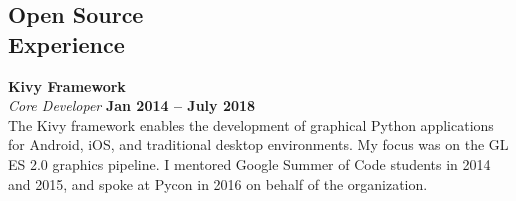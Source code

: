 \documentclass[margin,line]{resume}
\begin{document}
\begin{resume}
 \section{\mysidestyle Open Source\\Experience}

\textbf{Kivy Framework} \vspace{2mm}\\\vspace{1mm}%
    \textsl{Core Developer} \hfill \textbf{Jan 2014 -- July 2018}\\
The Kivy framework enables the development of graphical Python applications for Android, iOS, and traditional desktop environments. My focus was on the GL ES 2.0 graphics pipeline. I mentored Google Summer of Code students in 2014 and 2015, and spoke at Pycon in 2016 on behalf of the organization.


\end{resume}
\end{document}
